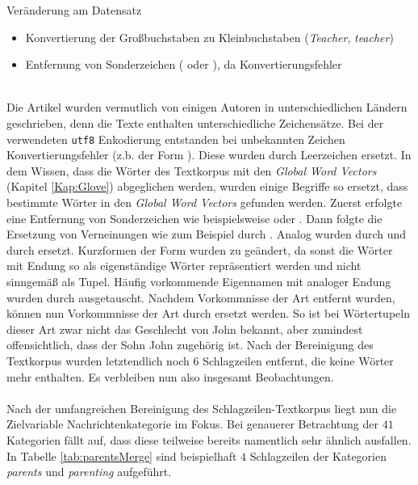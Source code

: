 \documentclass[10pt, xcolor = dvipsnames]{beamer}
\begin{document}
\begin{frame}{Veränderung am Datensatz}
\begin{itemize}
   \item Konvertierung der Großbuchstaben zu Kleinbuchstaben (\textit{Teacher}, \textit{teacher})
   \item Entfernung von Sonderzeichen ( oder ), da Konvertierungsfehler
   \end{itemize}
\end{frame}

\\
Die Artikel wurden vermutlich von einigen Autoren in unterschiedlichen Ländern geschrieben, denn die Texte enthalten unterschiedliche Zeichensätze. Bei der verwendeten \texttt{utf8} Enkodierung entstanden bei unbekannten Zeichen Konvertierungsfehler (z.b. der Form ). Diese wurden durch Leerzeichen ersetzt. In dem Wissen, dass die Wörter des Textkorpus mit den \textit{Global Word Vectors} (Kapitel \ref{Kap:Glove}) abgeglichen werden, wurden einige Begriffe so ersetzt, dass bestimmte Wörter in den \textit{Global Word Vectors} gefunden werden. Zuerst erfolgte eine Entfernung von Sonderzeichen wie beispielsweise  oder . Dann folgte die Ersetzung von Verneinungen wie zum Beispiel  durch . Analog wurden  durch  und  durch  ersetzt. Kurzformen der Form  wurden zu  geändert, da sonst die Wörter mit Endung  so als eigenständige Wörter repräsentiert werden und nicht sinngemäß als Tupel. Häufig vorkommende Eigennamen mit analoger Endung  wurden durch  ausgetauscht. Nachdem Vorkommnisse der Art  entfernt wurden, können nun Vorkommnisse der Art  durch  ersetzt werden. So ist bei Wörtertupeln dieser Art zwar nicht das Geschlecht von John bekannt, aber zumindest offensichtlich, dass der Sohn John zugehörig ist. Nach der Bereinigung des Textkorpus wurden letztendlich noch $6$ Schlagzeilen entfernt, die keine Wörter mehr enthalten. Es verbleiben nun also insgesamt  Beobachtungen.\\
\\
Nach der umfangreichen Bereinigung des Schlagzeilen-Textkorpus liegt nun die Zielvariable Nachrichtenkategorie im Fokus.
Bei genauerer Betrachtung der $41$ Kategorien fällt auf, dass diese teilweise bereits namentlich sehr ähnlich ausfallen. In Tabelle \ref{tab:parentsMerge} sind beispielhaft $4$ Schlagzeilen der Kategorien \textit{parents} und \textit{parenting} aufgeführt.
\end{document}
